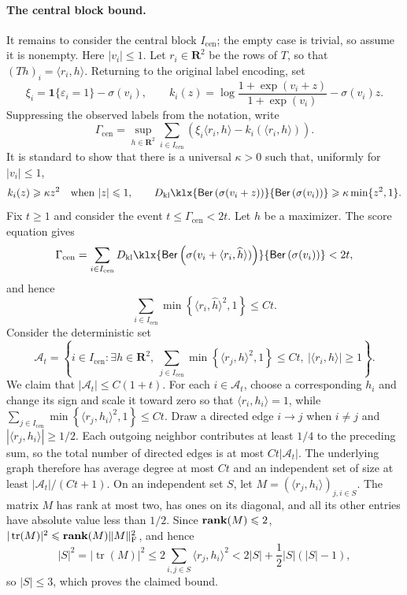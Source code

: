 \documentclass[11pt, letterpaper, hidelinks]{article}
\makeatletter
\renewcommand{\proofname}{\textit{\textbf{Proof}}}
\renewenvironment{proof}[1][\proofname]{\par\pushQED{\qed}\normalfont \topsep6\p@\@plus6\p@\relax\trivlist\item[\hskip\labelsep#1\@addpunct{}]\ignorespaces}{\popQED\endtrivlist\@endpefalse}
\newcommand{\proofsketchname}{\textit{\textbf{Proof sketch}}}
\newenvironment{proofsketch}
  {\begin{proof}[\proofsketchname]}
  {\end{proof}}
\newcommand{\R}{\mathbf R}
\newcommand{\1}{\mathbf 1}
\newcommand{\eps}{\varepsilon}
\renewcommand{\leq}{\leqslant}
\renewcommand{\geq}{\geqslant}
\DeclareMathOperator{\rank}{\bf rank}
\newcommand{\kl}{D_{\rm kl}\klx}
\theoremstyle{plain}
\theoremstyle{definition}
\newcommand{\Ber}[1]{\mathsf{Ber}\left(#1\right)}
\makeatother
\begin{document}
\begin{proofsketch}
\paragraph{The central block bound.}
It remains to consider the central block $I_{\mathrm{cen}}$; the empty case is
trivial, so assume it is nonempty.  Here $|v_i|\leq1$.  Let $r_i\in\R^2$ be
the rows of $T$, so that $(Th)_i=\langle r_i,h\rangle$.  Returning to the original label
encoding, set
\[
\xi_i=\1\{\eps_i=1\}-\sigma(v_i),
\qquad
k_i(z)=\log\frac{1+\exp(v_i+z)}{1+\exp(v_i)}-\sigma(v_i)z.
\]
Suppressing the observed labels from the notation, write
\[
\Gamma_{\mathrm{cen}}
=\sup_{h\in\R^2}\sum_{i\in I_{\mathrm{cen}}}
\left(\xi_i\langle r_i,h\rangle-k_i(\langle r_i,h\rangle)\right).
\]
It is standard to show that there is a universal $\kappa>0$ such that, uniformly for $|v_i|\leq1$,
\begin{equation}
\label{eq:d2-sketch-central-curvature}
k_i(z)\geq\kappa z^2\quad\text{when }|z|\leq1,
\qquad
\kl{\Ber{\sigma(v_i+z)}}{\Ber{\sigma(v_i)}}
\geq\kappa\min\{z^2,1\}.
\end{equation}
Fix $t\geq1$ and consider the event
$t\leq\Gamma_{\mathrm{cen}}<2t$.  Let $\widehat h$ be a maximizer.  The score
equation gives
\[
\Gamma_{\mathrm{cen}}
=\sum_{i\in I_{\mathrm{cen}}}
\kl{\Ber{\sigma(v_i+\langle r_i,\widehat h\rangle)}}
{\Ber{\sigma(v_i)}}<2t,
\]
and hence
\[
\sum_{i\in I_{\mathrm{cen}}}
\min\left\{\langle r_i,\widehat h\rangle^2,1\right\}\leq Ct.
\]
Consider the deterministic set
\[
\mathcal A_t=
\left\{i\in I_{\mathrm{cen}}:\exists h\in\R^2,
\ \sum_{j\in I_{\mathrm{cen}}}
\min\left\{\langle r_j,h\rangle^2,1\right\}\leq Ct,
\ |\langle r_i,h\rangle|\geq1\right\}.
\]
We claim that $|\mathcal A_t|\leq C(1+t)$.  For each
$i\in\mathcal A_t$, choose a corresponding $h_i$ and change its
sign and scale it toward zero so that $\langle r_i,h_i\rangle=1$, while
$\sum_{j\in I_{\mathrm{cen}}}
\min\left\{\langle r_j,h_i\rangle^2,1\right\}\leq Ct$.  Draw a directed edge
$i\to j$ when $i\ne j$ and $|\langle r_j,h_i\rangle|\geq1/2$.  Each
outgoing neighbor contributes at least $1/4$ to the preceding sum, so the total
number of directed edges is at most $Ct|\mathcal A_t|$.  The underlying graph
therefore has average degree at most $Ct$ and an independent set of size at
least $|\mathcal A_t|/(Ct+1)$.  On an independent set $S$, let
$M=(\langle r_j,h_i\rangle)_{j,i\in S}$.  The matrix $M$ has rank at most two,
has ones on its diagonal, and all its other entries have absolute value less
than $1/2$.  Since $\rank(M)\leq2$,
$|\operatorname{tr}(M)|^2\leq\rank(M)\|M\|_{\mathrm F}^2$, and hence
\[
|S|^2=|\operatorname{tr}(M)|^2
\leq2\sum_{i,j\in S}\langle r_j,h_i\rangle^2
<2|S|+\frac12|S|(|S|-1),
\]
so $|S|\leq3$, which proves the claimed bound.


\end{proofsketch}
\end{document}
